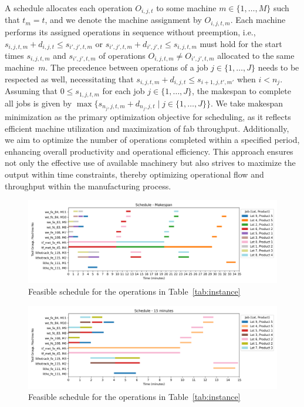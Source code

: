 \documentclass[runningheads]{llncs}
\begin{document}
A schedule allocates each operation $O_{i,j,t}$ to some machine
$m\in\{1,\dots,M\}$ such that $t_m=t$, and we denote the machine
assignment by $O_{i,j,t,m}$.
Each machine performs its assigned operations in sequence without
preemption, i.e.,
$s_{i,j,t,m} + d_{i,j,t} \leq s_{i',j',t,m}$ or
$s_{i',j',t,m} + d_{i',j',t} \leq s_{i,j,t,m}$
must hold for the start times
$s_{i,j,t,m}$ and $s_{i',j',t,m}$ of operations
$O_{i,j,t,m}\neq O_{i',j',t,m}$
allocated to the same machine~$m$.
The precedence between operations of a job $j\in\{1,\dots,J\}$ needs to be
respected as well, necessitating that
$s_{i,j,t,m} + d_{i,j,t} \leq s_{i+1,j,t',m'}$ when $i<n_j$.
Assuming that $0\leq s_{1,j,t,m}$ for each job $j\in\{1,\dots,J\}$,
the makespan to complete all jobs is given by
$\max\{s_{n_j,j,t,m} + d_{n_j,j,t} \mid j\in\{1,\dots,J\}\}$.
We take makespan minimization as the primary optimization objective for scheduling, as it reflects efficient machine utilization and maximization of fab throughput. Additionally, we aim to optimize the number of operations completed within a specified period, enhancing overall productivity and operational efficiency. This approach ensures not only the effective use of available machinery but also strives to maximize the output within time constraints, thereby optimizing operational flow and throughput within the manufacturing process.


\begin{figure}[t]
	\includegraphics[width=\textwidth]{schedule_example_makespan.png}
	\caption{Feasible schedule for the operations in Table~\ref{tab:instance}}
	\label{fig:sch-makespan}
\end{figure}
\begin{figure}[t]
	\includegraphics[width=\textwidth]{schedule_example_operations.png}
	\caption{Feasible schedule for the operations in Table~\ref{tab:instance}}
	\label{fig:sch-operations}
\end{figure}
\end{document}

